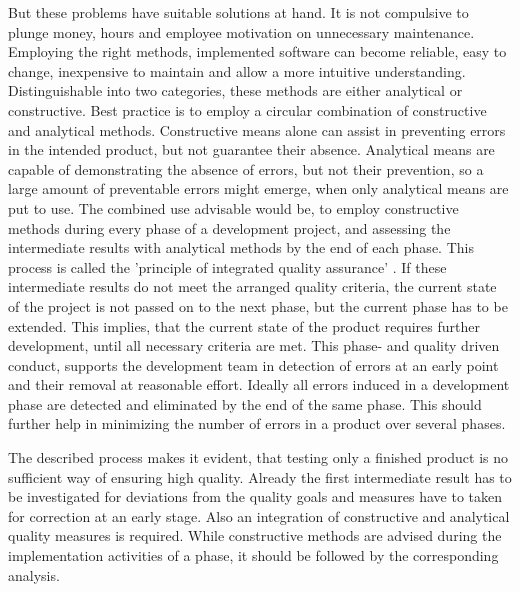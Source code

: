 But these problems have suitable solutions at hand. It is not compulsive to plunge money, hours and employee motivation on unnecessary maintenance. Employing the right methods, implemented software can become reliable, easy to change, inexpensive to maintain and allow a more intuitive understanding. Distinguishable into two categories, these methods are either analytical or constructive.
Best practice is to employ a circular combination of constructive and analytical methods. Constructive means alone can assist in preventing errors in the intended product, but not guarantee their absence. Analytical means are capable of demonstrating the absence of errors, but not their prevention, so a large amount of preventable errors might emerge, when only analytical means are put to use. The combined use advisable would be, to employ constructive methods during every phase of a development project, and assessing the intermediate results with analytical methods by the end of each phase. This process is called the 'principle of integrated quality assurance' \cite{Liggesmeyer2002}. If these intermediate results do not meet the arranged quality criteria, the current state of the project is not passed on to the next phase, but the current phase has to be extended. This implies, that the current state of the product requires further development, until all necessary criteria are met. This phase- and quality driven conduct, supports the development team in detection of errors at an early point and their removal at reasonable effort. Ideally all errors induced in a development phase are detected and eliminated by the end of the same phase. This should further help in minimizing the number of errors in a product over several phases. 

The described process makes it evident, that testing only a finished product is no sufficient way of ensuring high quality. Already the first intermediate result has to be investigated for deviations from the quality goals and measures have to taken for correction at an early stage. Also an integration of constructive and analytical quality measures is required. While constructive methods are advised during the implementation activities of a phase, it should be followed by the corresponding analysis.

